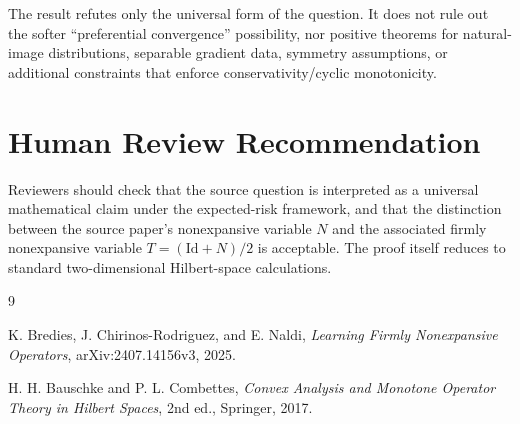 \documentclass[11pt]{article}
\newcommand{\Id}{\mathrm{Id}}
\begin{document}
The result refutes only the universal form of the question.  It does not rule
out the softer ``preferential convergence'' possibility, nor positive theorems
for natural-image distributions, separable gradient data, symmetry assumptions,
or additional constraints that enforce conservativity/cyclic monotonicity.

\section*{Human Review Recommendation}

Reviewers should check that the source question is interpreted as a universal
mathematical claim under the expected-risk framework, and that the distinction
between the source paper's nonexpansive variable $N$ and the associated firmly
nonexpansive variable $T=(\Id+N)/2$ is acceptable.  The proof itself reduces to
standard two-dimensional Hilbert-space calculations.

\begin{thebibliography}{9}

K. Bredies, J. Chirinos-Rodriguez, and E. Naldi,
\emph{Learning Firmly Nonexpansive Operators},
arXiv:2407.14156v3, 2025.

H. H. Bauschke and P. L. Combettes,
\emph{Convex Analysis and Monotone Operator Theory in Hilbert Spaces},
2nd ed., Springer, 2017.

\end{thebibliography}
\end{document}
